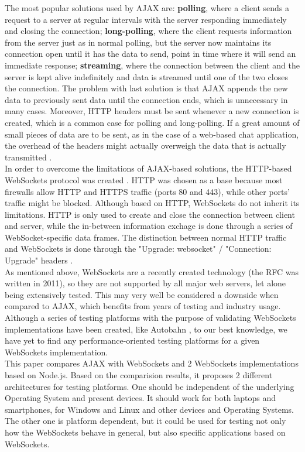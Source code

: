 \documentclass[conference]{IEEEtran}
\begin{document}
The most popular solutions used by AJAX are: \textbf{polling}, where a client sends
a request to a server at regular intervals with the server responding immediately
and closing the connection; \textbf{long-polling}, where the client requests
information from the server just as in normal polling, but the server now maintains
its connection open until it has the data to send, point in time where
it will send an immediate response;
\textbf{streaming}, where the connection between the client and the server is
kept alive indefinitely and data is streamed until one of the two closes the
connection. The problem with last solution is that AJAX
appends the new data to previously sent data until the connection ends, which is
unnecessary in many cases. Moreover, HTTP headers must be sent whenever a new
connection is created, which is a common case for polling and long-polling. If
a great amount of small pieces of data are to be sent, as in the case of a
web-based chat application, the overhead of the headers might actually overweigh
the data that is actually transmitted \cite{2009:Misc}.
\\

In order to overcome the limitations of AJAX-based solutions, the HTTP-based
WebSockets protocol was created \cite{RFC}. HTTP was chosen as a base because
most firewalls allow HTTP and HTTPS traffic  (ports 80 and 443), while other
ports' traffic might be blocked. Although based on HTTP, WebSockets do not
inherit its limitations. HTTP is only used to create and close the connection
between client and server, while the in-between information exchage is done
through a series of WebSocket-specific data frames. The distinction between
normal HTTP traffic and WebSockets is done through the "Upgrade: websocket" /
"Connection: Upgrade" headers \cite{RFC}.
\\

As mentioned above, WebSockets are a recently created technology  (the RFC was
written in 2011), so they are not supported by all major web servers, let alone
being extensively tested. This may very well be considered a downside when
compared to AJAX, which benefits from years of testing and industry usage.
Although a series of testing platforms with the purpose of validating WebSockets
implementations have been created, like Autobahn \cite{Autobahn}, to our best
knowledge, we have yet to find any performance-oriented testing platforms for a
given WebSockets implementation.
\\

This paper compares AJAX with WebSockets and 2 WebSockets implementations based
on Node.js. Based on the comparision results, it proposes 2 different architectures
for testing platforms. One should be independent of the underlying Operating
System and present devices. It should work for both laptops and smartphones,
for Windows and Linux and other devices and Operating Systems. The other one is
platform dependent, but it could be used for testing not only how the WebSockets
behave in general, but also specific applications based on WebSockets.
\vfill\eject
\end{document}

